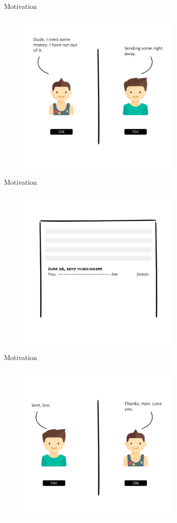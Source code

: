 \documentclass[usenames, dvipsnames]{beamer}
\begin{document}
  \begin{frame}{Motivation}
    \begin{figure}[ht!]
    \centering
    \includegraphics[width=80mm]{images/send_with_bank1.png}
    \end{figure}
  \end{frame}
  \begin{frame}{Motivation}
    \begin{figure}[ht!]
    \centering
        \includegraphics[width=80mm]{images/send_with_bank2.png}
    \end{figure}
  \end{frame}
  \begin{frame}{Motivation}
    \begin{figure}[ht!]
    \centering
    \includegraphics[width=80mm]{images/send_with_bank3.png}
    \end{figure}
  \end{frame}
\end{document}
